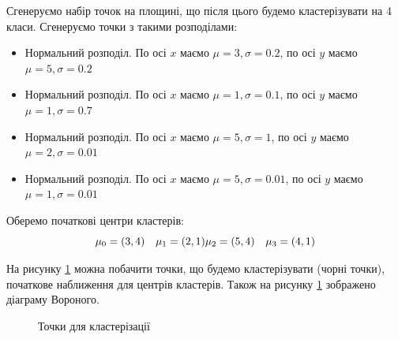 \documentclass[a4paper,12pt]{article}
\begin{document}
Сгенеруємо набір точок на площині, що після цього будемо кластерізувати на 4 класи.  Сгенеруємо точки з такими розподілами:

\begin{itemize}
	\item Нормальний розподіл. По осі $x$ маємо $\mu = 3, \sigma = 0.2$, по осі $y$ маємо $\mu = 5, \sigma = 0.2$ 
	\item Нормальний розподіл. По осі $x$ маємо $\mu = 1, \sigma = 0.1$, по осі $y$ маємо $\mu = 1, \sigma = 0.7$ 
	\item Нормальний розподіл. По осі $x$ маємо $\mu = 5, \sigma = 1$, по осі $y$ маємо $\mu = 2, \sigma = 0.01$  
	\item Нормальний розподіл. По осі $x$ маємо $\mu = 5, \sigma = 0.01$, по осі $y$ маємо $\mu = 1, \sigma = 0.01$
\end{itemize}

Оберемо початкові центри кластерів:
\[
	\mu_0 = (3,4) \quad \mu_1 = (2,1) \\
	\mu_2 = (5,4) \quad \mu_3 = (4,1)
\]

На рисунку \ref{fig:1} можна побачити точки, що будемо кластерізувати (чорні точки), початкове наближення для центрів кластерів. Також на рисунку \ref{fig:1} зображено діаграму Вороного.

\newpage
\begin{figure}[h]
	\caption{Точки для кластерізації}
	\label{fig:1}
\end{figure}
\end{document}
